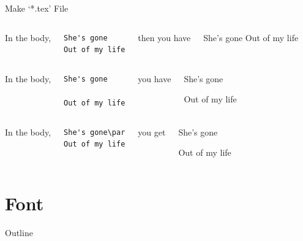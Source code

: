 \documentclass[12pt]{gshs_lecture}
\begin{document}
\begin{frame}[t,fragile]{Make `*.tex' File}\small
\begin{columns}[T]
In the body,
\begin{block}{}
\begin{lstlisting}
She's gone
Out of my life
\end{lstlisting}
\end{block}
then you have
\begin{block}{}
\textrm{She's gone Out of my life}
\end{block}
\end{columns}
\vspace{2em}
\begin{columns}[T]
In the body,
\begin{block}{}
\begin{lstlisting}
She's gone

Out of my life
\end{lstlisting}
\end{block}
you have
\begin{block}{}
\textrm{She's gone}\par
\textrm{Out of my life}
\end{block}
\end{columns}
\vspace{2em}
\begin{columns}[T]
In the body,
\begin{block}{}
\begin{lstlisting}
She's gone\par
Out of my life
\end{lstlisting}
\end{block}
you get
\begin{block}{}
\textrm{She's gone}\par
\textrm{Out of my life}
\end{block}
\end{columns}
\end{frame}

\section{Font} %

\begin{frame}[t]{Outline}
\tableofcontents[currentsection]
\end{frame}
\end{document}
